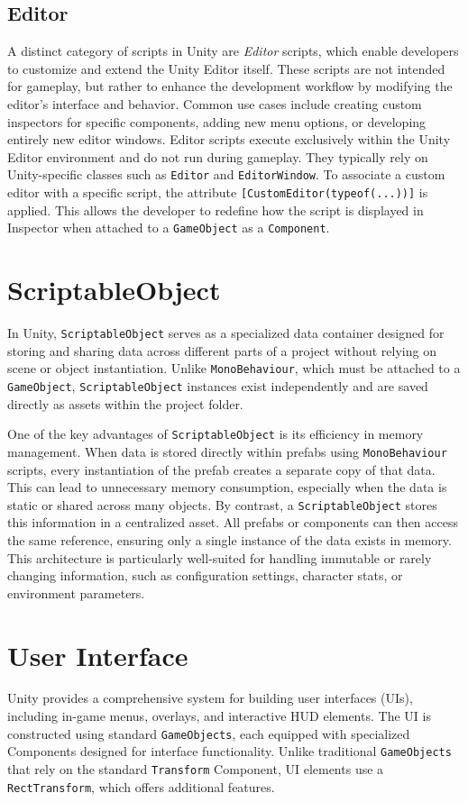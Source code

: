 \subsection{Editor}
A distinct category of scripts in Unity are \textit{Editor} scripts, which enable developers to customize and extend the Unity Editor itself. These scripts are not intended for gameplay, but rather to enhance the development workflow by modifying the editor’s interface and behavior. Common use cases include creating custom inspectors for specific components, adding new menu options, or developing entirely new editor windows. Editor scripts execute exclusively within the Unity Editor environment and do not run during gameplay. They typically rely on Unity-specific classes such as \verb|Editor| and \verb|EditorWindow|. To associate a custom editor with a specific script, the attribute \verb|[CustomEditor(typeof(...))]| is applied. This allows the developer to redefine how the script is displayed in Inspector when attached to a \verb|GameObject| as a \verb|Component|.


 \section{ScriptableObject}
In Unity, \verb|ScriptableObject| serves as a specialized data container designed for storing and sharing data across different parts of a project without relying on scene or object instantiation. Unlike \verb|MonoBehaviour|, which must be attached to a \verb|GameObject|, \verb|ScriptableObject| instances exist independently and are saved directly as assets within the project folder.

One of the key advantages of \verb|ScriptableObject| is its efficiency in memory management. When data is stored directly within prefabs using \verb|MonoBehaviour| scripts, every instantiation of the prefab creates a separate copy of that data. This can lead to unnecessary memory consumption, especially when the data is static or shared across many objects. By contrast, a \verb|ScriptableObject| stores this information in a centralized asset. All prefabs or components can then access the same reference, ensuring only a single instance of the data exists in memory. This architecture is particularly well-suited for handling immutable or rarely changing information, such as configuration settings, character stats, or environment parameters.

\section{User Interface}
Unity provides a comprehensive system for building user interfaces (UIs), including in-game menus, overlays, and interactive HUD elements. The UI is constructed using standard \verb|GameObjects|, each equipped with specialized Components designed for interface functionality. Unlike traditional \verb|GameObjects| that rely on the standard \verb|Transform| Component, UI elements use a \verb|RectTransform|, which offers additional features.

